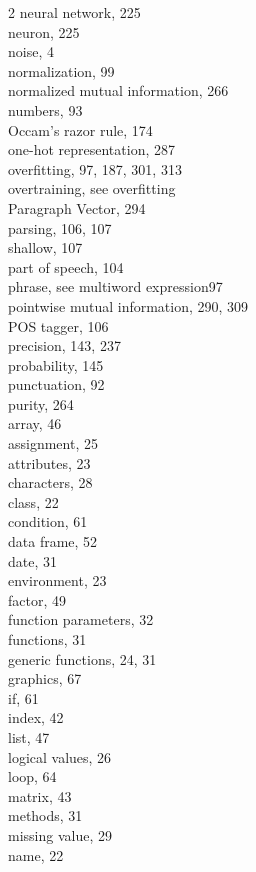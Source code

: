 \documentclass[11pt,openany,executivepaper]{book}
\begin{document}
\begin{multicols}{2}
neural network, 225\\
neuron, 225\\
noise, 4\\
normalization, 99\\
normalized mutual information, 266\\
numbers, 93\\
Occam's razor rule, 174\\
one-hot representation, 287\\
overfitting, 97, 187, 301, 313\\
overtraining, see overfitting\\
Paragraph Vector, 294\\
parsing, 106, 107\\
shallow, 107\\
part of speech, 104\\
phrase, see multiword expression97\\
pointwise mutual information, 290, 309\\
POS tagger, 106\\
precision, 143, 237\\
probability, 145\\
punctuation, 92\\
purity, 264\\
array, 46\\
assignment, 25\\
attributes, 23\\
characters, 28\\
class, 22\\
condition, 61\\
data frame, 52\\
date, 31\\
environment, 23\\
factor, 49\\
function parameters, 32\\
functions, 31\\
generic functions, 24, 31\\
graphics, 67\\
if, 61\\
index, 42\\
list, 47\\
logical values, 26\\
loop, 64\\
matrix, 43\\
methods, 31\\
missing value, 29\\
name, 22\\

\end{multicols}
\end{document}
